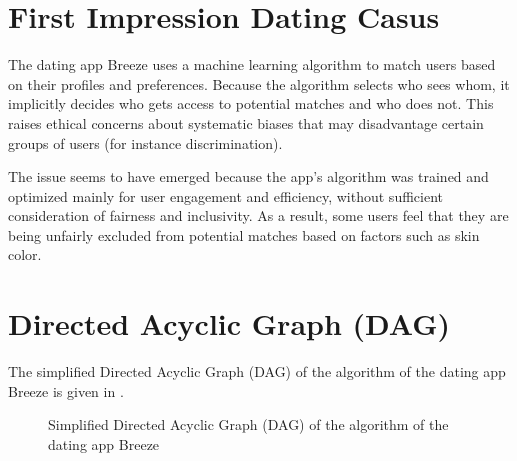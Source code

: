 \documentclass[11pt, twoside]{article}
\numberwithin{equation}{section}
\newcommand{\fullref}[1]{\hyperref[#1]{\Cref{#1}}}
\begin{document}

\newpage
{}
\setcounter{page}{1}

\section{First Impression Dating Casus}
The dating app Breeze uses a machine learning algorithm to match users based on their profiles and preferences. Because the algorithm selects who sees whom, it implicitly decides who gets access to potential matches and who does not. This raises ethical concerns about systematic biases that may disadvantage certain groups of users (for instance discrimination). 

The issue seems to have emerged because the app's algorithm was trained and optimized mainly for user engagement and efficiency, without sufficient consideration of fairness and inclusivity. As a result, some users feel that they are being unfairly excluded from potential matches based on factors such as skin color.

\section{Directed Acyclic Graph (DAG)}
The simplified Directed Acyclic Graph (DAG) of the algorithm of the dating app Breeze is given in \fullref{fig:DAG}. 

\begin{figure}[h!]
\centering
{}
\caption{Simplified Directed Acyclic Graph (DAG) of the algorithm of the dating app Breeze}
\label{fig:DAG}
\end{figure}
\end{document}
